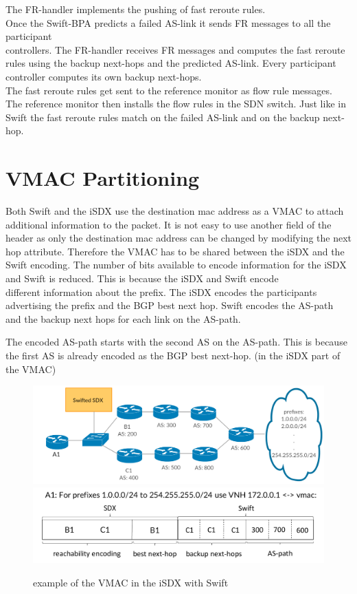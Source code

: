 The FR-handler implements the pushing of fast reroute rules.  \\
Once the Swift-BPA predicts a failed AS-link it sends FR messages to all the participant \\ controllers.
The FR-handler receives FR messages and computes the fast reroute rules using the backup next-hops and the predicted AS-link. Every participant controller computes its own backup next-hops. \\ The fast reroute rules get sent to the reference monitor as flow rule messages. The reference monitor then installs the flow rules in the SDN switch. Just like in Swift the fast reroute rules match on the failed AS-link and on the backup next-hop.    

\newpage

\section{\label{chapter4:vmac_partitioning}VMAC Partitioning}

Both Swift and the iSDX use the destination mac address as a VMAC to attach additional information to the packet. It is not easy to use another field of the header as only the destination mac address can be changed by modifying the next hop attribute. Therefore the VMAC has to be shared between the iSDX and the Swift encoding. The number of bits available to encode information for the iSDX and Swift is reduced. This is because the iSDX and Swift encode \\ 
different information about the prefix. The iSDX encodes the participants advertising the prefix and the BGP best next hop. Swift encodes the AS-path and the backup next hops for each link on the AS-path.

The encoded AS-path starts with the second AS on the AS-path. This is because the first AS is already encoded as the BGP best next-hop. (in the iSDX part of the VMAC)

\begin{figure}[h]
\center
\includegraphics[scale = 0.24]{Figures/design_vmac_topology.pdf}
\includegraphics[scale = 0.35]{Figures/design_vmac_cropped.pdf}
\caption{example of the VMAC in the iSDX with Swift}
\end{figure}

